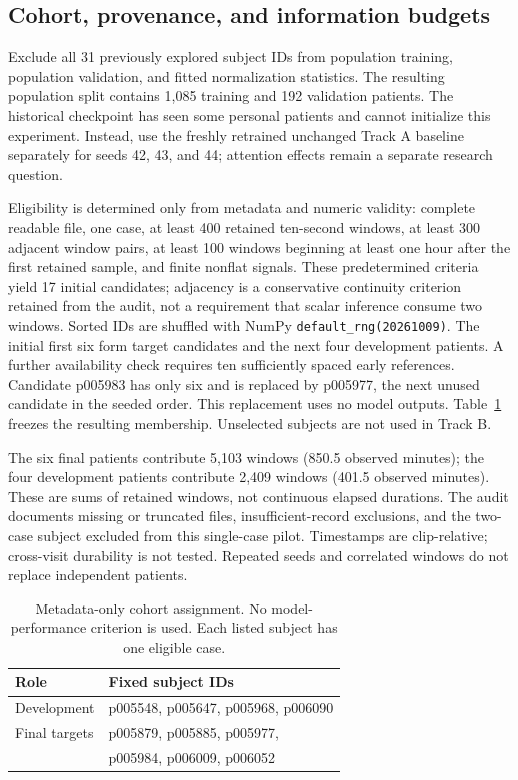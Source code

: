 \documentclass[11pt]{article}
\begin{document}
\subsection{Cohort, provenance, and information budgets}
Exclude all 31 previously explored subject IDs from population training, population validation, and fitted normalization statistics. The resulting population split contains 1,085 training and 192 validation patients. The historical checkpoint has seen some personal patients and cannot initialize this experiment. Instead, use the freshly retrained unchanged Track A baseline separately for seeds 42, 43, and 44; attention effects remain a separate research question.

Eligibility is determined only from metadata and numeric validity: complete readable file, one case, at least 400 retained ten-second windows, at least 300 adjacent window pairs, at least 100 windows beginning at least one hour after the first retained sample, and finite nonflat signals. These predetermined criteria yield 17 initial candidates; adjacency is a conservative continuity criterion retained from the audit, not a requirement that scalar inference consume two windows. Sorted IDs are shuffled with NumPy \texttt{default\_rng(20261009)}. The initial first six form target candidates and the next four development patients. A further availability check requires ten sufficiently spaced early references. Candidate p005983 has only six and is replaced by p005977, the next unused candidate in the seeded order. This replacement uses no model outputs. Table~\ref{tab:cohort} freezes the resulting membership. Unselected subjects are not used in Track B.

The six final patients contribute 5,103 windows (850.5 observed minutes); the four development patients contribute 2,409 windows (401.5 observed minutes). These are sums of retained windows, not continuous elapsed durations. The audit documents missing or truncated files, insufficient-record exclusions, and the two-case subject excluded from this single-case pilot. Timestamps are clip-relative; cross-visit durability is not tested. Repeated seeds and correlated windows do not replace independent patients.

\begin{table}[t]
\centering\small
\begin{tabular}{ll}
\toprule
Role & Fixed subject IDs\\
\midrule
Development & p005548, p005647, p005968, p006090\\
Final targets & p005879, p005885, p005977,\\
 & p005984, p006009, p006052\\
\bottomrule
\end{tabular}
\caption{Metadata-only cohort assignment. No model-performance criterion is used. Each listed subject has one eligible case.}
\label{tab:cohort}
\end{table}
\end{document}

